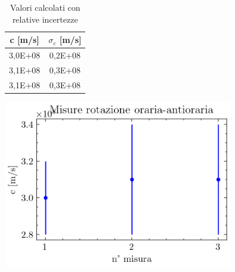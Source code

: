 \documentclass{article}
\begin{document}
            \begin{table}[H]
                
                \centering
                \begin{minipage}{0.35\linewidth}

                    \centering
                    \begin{tabular}{ c c }
                        
                        \toprule
                        c [m/s] &  $\sigma_c$ [m/s] \\
                        
                        \midrule
                        3,0E+08 & 0,2E+08  \\
                        3,1E+08 & 0,3E+08  \\ 
                        3,1E+08 & 0,3E+08  \\
                        \bottomrule 

                    \end{tabular}

                    \caption{Valori calcolati con relative incertezze}

                \end{minipage}
                \begin{minipage}{0.6\linewidth}

                    \centering
                    \includegraphics[width=10cm]{../images/CW_CCW.png}


                \end{minipage}

            \end{table}
\end{document}
